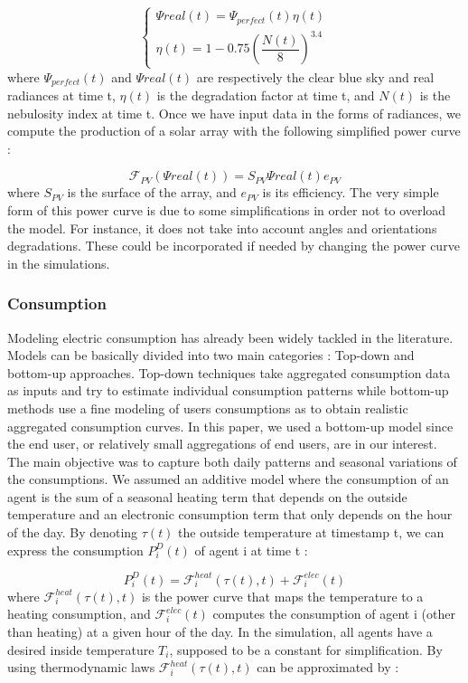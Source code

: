 \documentclass[journal]{IEEEtran}
\begin{document}
\begin{equation}
\left\{ \begin{array}{lll}
			\Psi{real}(t) = \Psi_{perfect}(t) \eta(t) \\
			\eta(t) = 1-0.75 \left( \dfrac{N(t)}{8} \right)^{3.4}
\end{array} \right.
\end{equation}
where $ \Psi_{perfect}(t) $ and $ \Psi{real}(t) $ are respectively the clear blue sky and real radiances at time t, $ \eta(t) $ is the degradation factor at time t, and $ N(t) $ is the nebulosity index at time t. Once we have input data in the forms of radiances, we compute the production of a solar array with the following simplified power curve :

\begin{equation}
\mathcal{F}_{PV}(\Psi{real}(t)) =  S_{PV} \Psi{real}(t)  e_{PV}
\end{equation}
where $ S_{PV} $ is the surface of the array, and $ e_{PV} $ is its efficiency. The very simple form of this power curve is due to some simplifications in order not to overload the model. For instance, it does not take into account angles and orientations degradations. These could be incorporated if needed by changing the power curve in the simulations.

\subsubsection{Consumption}
Modeling electric consumption has already been widely tackled in the literature. Models can be basically divided into two main categories : Top-down and bottom-up approaches. Top-down techniques take aggregated consumption data as inputs and try to estimate individual consumption patterns while bottom-up methods use a fine modeling of users consumptions as to obtain realistic aggregated consumption curves. In this paper, we used a bottom-up model since the end user, or relatively small aggregations of end users, are in our interest. The main objective was to capture both daily patterns and seasonal variations of the consumptions. We assumed an additive model where the consumption of an agent is the sum of a seasonal heating term that depends on the outside temperature and an electronic consumption term that only depends on the hour of the day. By denoting $ \tau(t) $ the outside temperature at timestamp t, we can express the consumption $ P_{i}^{D}(t) $ of agent i at time t :

\begin{equation}
P_{i}^{D}(t) = \mathcal{F}_{i}^{heat}(\tau(t), t) + \mathcal{F}_{i}^{elec}(t)
\end{equation}
where $ \mathcal{F}_{i}^{heat}(\tau(t), t) $ is the power curve that maps the temperature to a heating consumption, and $ \mathcal{F}_{i}^{elec}(t) $ computes the consumption of agent i (other than heating) at a given hour of the day. In the simulation, all agents have a desired inside temperature $ T_{i} $, supposed to be a constant for simplification. By using thermodynamic laws $ \mathcal{F}_{i}^{heat}(\tau(t), t) $ can be approximated by :
\end{document}
